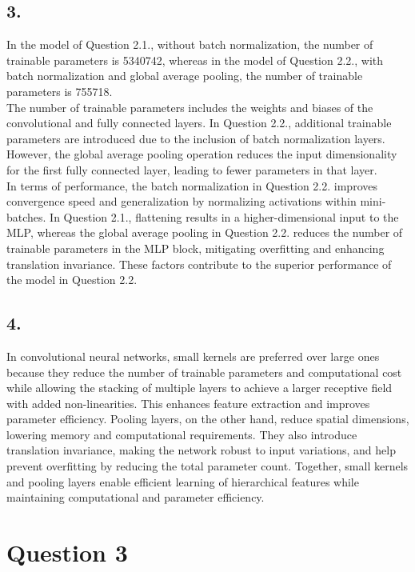 \documentclass[12pt,a4paper]{article}
\begin{document}
    \subsection{3.}
        In the model of Question 2.1., without batch normalization, the number of trainable parameters is 5340742, whereas in the model of Question 2.2., with batch normalization and global average pooling, the number of trainable parameters is 755718. \\
        The number of trainable parameters includes the weights and biases of the convolutional and fully connected layers. In Question 2.2., additional trainable parameters are introduced due to the inclusion of batch normalization layers. However, the global average pooling operation reduces the input dimensionality for the first fully connected layer, leading to fewer parameters in that layer. \\
        In terms of performance, the batch normalization in Question 2.2. improves convergence speed and generalization by normalizing activations within mini-batches. In Question 2.1., flattening results in a higher-dimensional input to the MLP, whereas the global average pooling in Question 2.2. reduces the number of trainable parameters in the MLP block, mitigating overfitting and enhancing translation invariance. These factors contribute to the superior performance of the model in Question 2.2.

    \subsection{4.}
        In convolutional neural networks, small kernels are preferred over large ones because they reduce the number of trainable parameters and computational cost while allowing the stacking of multiple layers to achieve a larger receptive field with added non-linearities. This enhances feature extraction and improves parameter efficiency. Pooling layers, on the other hand, reduce spatial dimensions, lowering memory and computational requirements. They also introduce translation invariance, making the network robust to input variations, and help prevent overfitting by reducing the total parameter count. Together, small kernels and pooling layers enable efficient learning of hierarchical features while maintaining computational and parameter efficiency.


    \newpage
    \section{Question 3}
\end{document}
